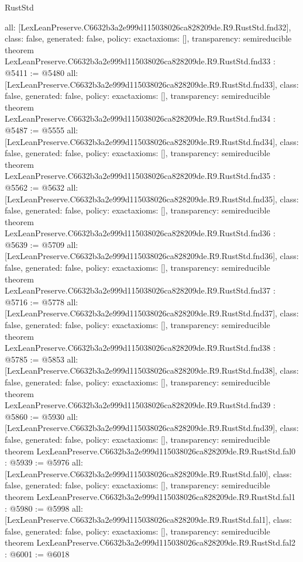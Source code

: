\begin{lexlean}{RustStd}
\begin{coremodule}
{  all: [LexLeanPreserve.C6632b3a2e999d115038026ca828209de.R9.RustStd.fnd32],
  class: false,
  generated: false,
  policy: exact{axioms: []},
  transparency: semireducible
}
theorem LexLeanPreserve.C6632b3a2e999d115038026ca828209de.R9.RustStd.fnd33 : @5411 := @5480 {
  all: [LexLeanPreserve.C6632b3a2e999d115038026ca828209de.R9.RustStd.fnd33],
  class: false,
  generated: false,
  policy: exact{axioms: []},
  transparency: semireducible
}
theorem LexLeanPreserve.C6632b3a2e999d115038026ca828209de.R9.RustStd.fnd34 : @5487 := @5555 {
  all: [LexLeanPreserve.C6632b3a2e999d115038026ca828209de.R9.RustStd.fnd34],
  class: false,
  generated: false,
  policy: exact{axioms: []},
  transparency: semireducible
}
theorem LexLeanPreserve.C6632b3a2e999d115038026ca828209de.R9.RustStd.fnd35 : @5562 := @5632 {
  all: [LexLeanPreserve.C6632b3a2e999d115038026ca828209de.R9.RustStd.fnd35],
  class: false,
  generated: false,
  policy: exact{axioms: []},
  transparency: semireducible
}
theorem LexLeanPreserve.C6632b3a2e999d115038026ca828209de.R9.RustStd.fnd36 : @5639 := @5709 {
  all: [LexLeanPreserve.C6632b3a2e999d115038026ca828209de.R9.RustStd.fnd36],
  class: false,
  generated: false,
  policy: exact{axioms: []},
  transparency: semireducible
}
theorem LexLeanPreserve.C6632b3a2e999d115038026ca828209de.R9.RustStd.fnd37 : @5716 := @5778 {
  all: [LexLeanPreserve.C6632b3a2e999d115038026ca828209de.R9.RustStd.fnd37],
  class: false,
  generated: false,
  policy: exact{axioms: []},
  transparency: semireducible
}
theorem LexLeanPreserve.C6632b3a2e999d115038026ca828209de.R9.RustStd.fnd38 : @5785 := @5853 {
  all: [LexLeanPreserve.C6632b3a2e999d115038026ca828209de.R9.RustStd.fnd38],
  class: false,
  generated: false,
  policy: exact{axioms: []},
  transparency: semireducible
}
theorem LexLeanPreserve.C6632b3a2e999d115038026ca828209de.R9.RustStd.fnd39 : @5860 := @5930 {
  all: [LexLeanPreserve.C6632b3a2e999d115038026ca828209de.R9.RustStd.fnd39],
  class: false,
  generated: false,
  policy: exact{axioms: []},
  transparency: semireducible
}
theorem LexLeanPreserve.C6632b3a2e999d115038026ca828209de.R9.RustStd.fal0 : @5939 := @5976 {
  all: [LexLeanPreserve.C6632b3a2e999d115038026ca828209de.R9.RustStd.fal0],
  class: false,
  generated: false,
  policy: exact{axioms: []},
  transparency: semireducible
}
theorem LexLeanPreserve.C6632b3a2e999d115038026ca828209de.R9.RustStd.fal1 : @5980 := @5998 {
  all: [LexLeanPreserve.C6632b3a2e999d115038026ca828209de.R9.RustStd.fal1],
  class: false,
  generated: false,
  policy: exact{axioms: []},
  transparency: semireducible
}
theorem LexLeanPreserve.C6632b3a2e999d115038026ca828209de.R9.RustStd.fal2 : @6001 := @6018 {
}
\end{coremodule}
\end{lexlean}
